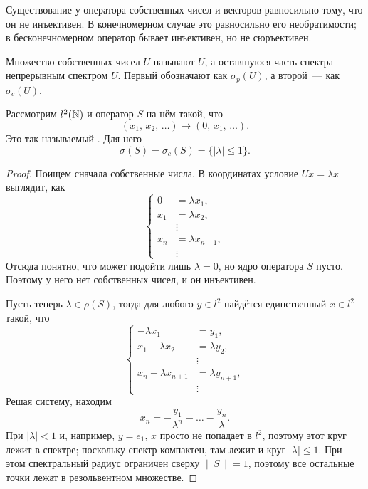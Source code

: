 \documentclass{notes}
\begin{document}
	\begin{rem}
		Существование у оператора собственных чисел и векторов равносильно тому, что он не инъективен. В конечномерном случае это равносильно его необратимости; в бесконечномерном оператор бывает инъективен, но не сюръективен.
	\end{rem}

	\begin{de}
		Множество собственных чисел $U$ называют  $U$, а оставшуюся часть спектра~--- непрерывным спектром $U$. Первый обозначают как $\sigma_p(U)$, а второй~--- как $\sigma_c(U)$.
	\end{de}

	\begin{exm}
		Рассмотрим $l^2(\mathbb{N})$ и оператор $S$ на нём такой, что
		\[
			(x_1, \, x_2, \, \ldots) \mapsto (0, \, x_1, \, \ldots).
		\]
		Это так называемый . Для него
		\[
			\sigma(S) = \sigma_c(S) = \{|\lambda| \leqslant 1\}.
		\]
		\begin{proof}
			Поищем сначала собственные числа. В координатах условие $Ux = \lambda x$ выглядит, как
			\[
				\begin{cases}
					0 &= \lambda x_1, \\
					x_1 &= \lambda x_2, \\
					&\vdots \\
					x_n &= \lambda x_{n + 1}, \\
					& \vdots
				\end{cases}
			\]
			Отсюда понятно, что может подойти лишь $\lambda = 0$, но ядро оператора $S$ пусто. Поэтому у него нет собственных чисел, и он инъективен.

			Пусть теперь $\lambda \in \rho(S)$, тогда для любого $y \in l^2$ найдётся единственный $x \in l^2$ такой, что
			\[
				\begin{cases}
					-\lambda x_1 &= y_1, \\
					x_1 - \lambda x_2 &= \lambda y_2, \\
					&\vdots \\
					x_n - \lambda x_{n + 1} &= \lambda y_{n + 1}, \\
					& \vdots
				\end{cases}
			\]
			Решая систему, находим
			\[
				x_n = -\dfrac{y_1}{\lambda^n} - \ldots - \dfrac{y_n}{\lambda}.
			\]
			При $|\lambda| < 1$ и, например, $y = e_1$, $x$ просто не попадает в $l^2$, поэтому этот круг лежит в спектре; поскольку спектр компактен, там лежит и круг $|\lambda| \leqslant 1$. При этом спектральный радиус ограничен сверху $\|S\| = 1$, поэтому все остальные точки лежат в резольвентном множестве.
		\end{proof}
	\end{exm}
\end{document}
